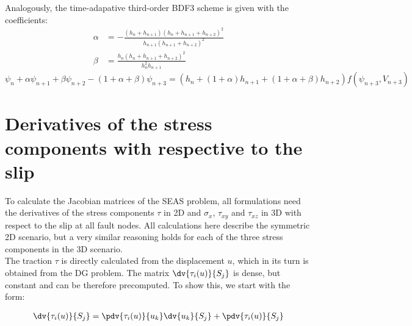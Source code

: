 Analogously, the time-adapative third-order BDF3 scheme is given with the coefficients: 
\begin{align}
\alpha &= -\frac{\left(h_n+h_{n+1}\right)\left(h_n+h_{n+1}+h_{n+2}\right)^2}
{h_{n+1}\left(h_{n+1}+h_{n+2}\right)^2} \\
\beta &= \frac{h_n\left(h_n+h_{n+1}+h_{n+2}\right)^2}
{h_{n}^2h_{n+1}}
\end{align}
\begin{equation}
\label{eq:BDF_coeffs_3rd_order}
\psi_n + \alpha \psi_{n+1} + \beta \psi_{n+2} -(1+\alpha+\beta)\psi_{n+3} = \left(h_n + (1+\alpha)h_{n+1} + (1+\alpha+\beta)h_{n+2}\right)f(\psi_{n+3},V_{n+3})
\end{equation}


\section{Derivatives of the stress components with respective to the slip}
\label{apx:dtau_dS}
To calculate the Jacobian matrices of the SEAS problem, all formulations need the derivatives of the stress components $\tau$ in 2D and $\sigma_x$, $\tau_{xy}$ and $\tau_{xz}$ in 3D with respect to the slip at all fault nodes. All calculations here describe the symmetric 2D scenario, but a very similar reasoning holds for each of the three stress components in the 3D scenario. \\

The traction $\tau$ is directly calculated from the displacement $u$, which in its turn is obtained from the DG problem. The matrix $\dv{\tau_i(u)}{S_j}$ is dense, but constant and can be therefore precomputed. To show this, we start with the form:

\begin{align}
\label{eq:partialDerivative_df_dS}
\dv{\tau_i(u)}{S_j} = \pdv{\tau_i(u)}{u_k}\dv{u_k}{S_j} + \pdv{\tau_i(u)}{S_j}
\end{align}

